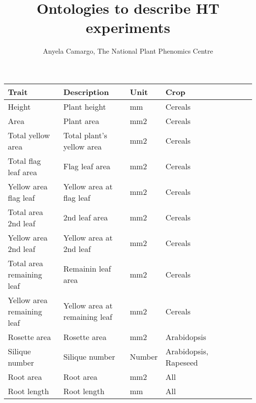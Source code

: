 \documentclass{article}
\begin{document}
\title{Ontologies to describe HT experiments}
\author{Anyela Camargo, The National Plant Phenomics Centre}

\maketitle




\begin{tabular}{l*{6}{l}l}
Trait              & Description & Unit & Crop\\

\hline
Height&  Plant height & mm& Cereals\\
Area 	& Plant area & mm2& Cereals  \\
Total yellow area	& Total plant's yellow area	& mm2& Cereals   \\
Total flag leaf area	&Flag leaf area& mm2& Cereals   \\
Yellow area flag leaf&Yellow area at flag leaf&mm2& Cereals	\\
Total area 2nd leaf	&2nd leaf area	&mm2& Cereals	\\
Yellow area 2nd leaf	&Yellow area at 2nd leaf	&mm2& Cereals	\\
Total area remaining leaf	&Remainin leaf area	&mm2& Cereals	\\
Yellow area remaining leaf	&Yellow area at  remaining leaf	&mm2& Cereals	\\
Rosette area&Rosette area&mm2&Arabidopsis	\\
Silique number	&Silique number&Number	&Arabidopsis, Rapeseed	\\
Root area	&Root area	&mm2	&All	\\
Root length	&Root length	&mm	&All	\\
\hline
\end{tabular}
\end{document}
